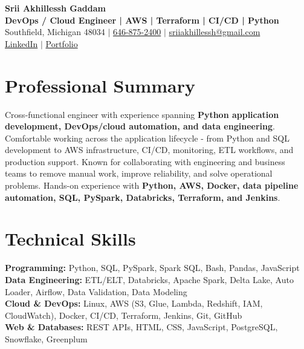 \documentclass[letterpaper,10pt]{article}
\begin{document}
\fontsize{9.35pt}{10.45pt}\selectfont

\begin{center}
    {\LARGE \textbf{Srii Akhillessh Gaddam}} \\[-1pt]
    \textbf{DevOps / Cloud Engineer | AWS | Terraform | CI/CD | Python} \\[2pt]
    Southfield, Michigan 48034 $|$
    \href{tel:6468752400}{646-875-2400} $|$
    \href{mailto:sriiakhillessh@gmail.com}{sriiakhillessh@gmail.com} \\[1pt]
    \href{https://www.linkedin.com/in/srii-akhiilessh-gaddam-b48668191/}{LinkedIn} $|$
    \href{https://sriiakhillesshg.github.io/portfolio/}{Portfolio}
\end{center}
\vspace{-8pt}

\section{Professional Summary}
\small{Cross-functional engineer with experience spanning \textbf{Python application development, DevOps/cloud automation, and data engineering}. Comfortable working across the application lifecycle - from Python and SQL development to AWS infrastructure, CI/CD, monitoring, ETL workflows, and production support. Known for collaborating with engineering and business teams to remove manual work, improve reliability, and solve operational problems. Hands-on experience with \textbf{Python, AWS, Docker, data pipeline automation, SQL, PySpark, Databricks, Terraform, and Jenkins}.}

\section{Technical Skills}
\small{
\textbf{Programming:} Python, SQL, PySpark, Spark SQL, Bash, Pandas, JavaScript \\
\textbf{Data Engineering:} ETL/ELT, Databricks, Apache Spark, Delta Lake, Auto Loader, Airflow, Data Validation, Data Modeling \\
\textbf{Cloud \& DevOps:} Linux, AWS (S3, Glue, Lambda, Redshift, IAM, CloudWatch), Docker, CI/CD, Terraform, Jenkins, Git, GitHub \\
\textbf{Web \& Databases:} REST APIs, HTML, CSS, JavaScript, PostgreSQL, Snowflake, Greenplum
}
\end{document}
